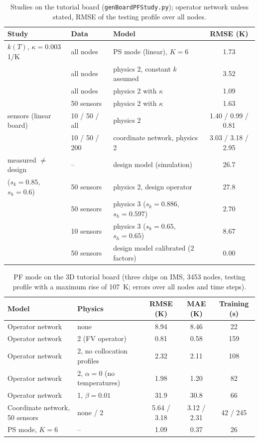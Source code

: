 \documentclass[11pt,a4paper]{article}
\begin{document}
\begin{table}[h]\centering\footnotesize
\caption{Studies on the tutorial board (\texttt{genBoardPFStudy.py}); operator network unless stated, RMSE of the
testing profile over all nodes.}\label{tab:pfstudy}
\begin{tabular}{@{}lllc@{}}\toprule
Study & Data & Model & RMSE (K) \\\midrule
$k(T)$, $\kappa=0.003$\,1/K & all nodes & PS mode (linear), $K=6$ & 1.73 \\
 & all nodes & physics 2, constant $k$ assumed & 3.52 \\
 & all nodes & physics 2 with $\kappa$ & 1.09 \\
 & 50 sensors & physics 2 with $\kappa$ & 1.63 \\\midrule
sensors (linear board) & 10 / 50 / all & physics 2 & 1.40 / 0.99 / 0.81 \\
 & 10 / 50 / 200 & coordinate network, physics 2 & 3.03 / 3.18 / 2.95 \\\midrule
measured $\neq$ design & -- & design model (simulation) & 26.7 \\
($s_k=0.85$, $s_h=0.6$) & 50 sensors & physics 2, design operator & 27.8 \\
 & 50 sensors & physics 3 ($s_k=0.886$, $s_h=0.597$) & 2.70 \\
 & 10 sensors & physics 3 ($s_k=0.65$, $s_h=0.65$) & 8.67 \\
 & 50 sensors & design model calibrated (2 factors) & 0.00 \\\bottomrule
\end{tabular}
\end{table}

\begin{table}[h]\centering\footnotesize
\caption{PF mode on the 3D tutorial board (three chips on IMS, 3453 nodes, testing profile with a maximum rise of
\SI{107}{\kelvin}; errors over all nodes and time steps).}\label{tab:pf}
\begin{tabular}{@{}llccc@{}}\toprule
Model & Physics & RMSE (K) & MAE (K) & Training (s) \\\midrule
Operator network & none & 8.94 & 8.46 & 22 \\
Operator network & 2 (FV operator) & 0.81 & 0.58 & 159 \\
Operator network & 2, no collocation profiles & 2.32 & 2.11 & 108 \\
Operator network & 2, $\alpha=0$ (no temperatures) & 1.98 & 1.20 & 82 \\
Operator network & 1, $\beta=0.01$ & 31.9 & 30.8 & 66 \\
Coordinate network, 50 sensors & none / 2 & 5.64 / 3.18 & 3.12 / 2.31 & 42 / 245 \\
PS mode, $K=6$ & -- & 1.09 & 0.37 & 26 \\\bottomrule
\end{tabular}
\end{table}
\end{document}
